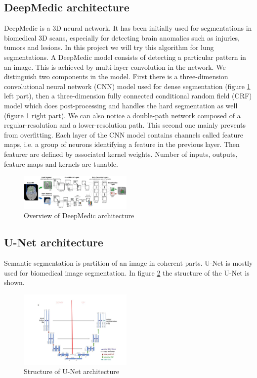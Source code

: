 \subsection{DeepMedic architecture}
DeepMedic is a 3D neural network. It has been initially used for segmentations in biomedical 3D scans, especially for detecting brain anomalies such as injuries, tumors and lesions. In this project we will try this algorithm for lung segmentations. \newline 
A DeepMedic model consists of detecting a particular pattern in an image. This is achieved by multi-layer convolution in the network. We distinguish two components in the model. First there is a three-dimension convolutional neural network (CNN) model used for dense segmentation (figure \ref{deepmedic} left part), then  a three-dimension fully connected conditional random field (CRF) model which does post-processing and handles the hard segmentation as well (figure \ref{deepmedic} right part). We can also notice a double-path network composed of a regular-resolution and a lower-resolution path. This second one mainly prevents from overfitting.
Each layer of the CNN model contains channels called feature maps, i.e. a group of neurons identifying a feature in the previous layer. Then featurer are defined by associated kernel weights. Number of inputs, outputs, feature-maps and kernels are tunable.

\begin{figure}[h!]
	\includegraphics[width=0.49\textwidth, angle=0]{files/deepmedic.png}
	\caption{ Overview of DeepMedic architecture}
	\label{deepmedic}
\end{figure}

\subsection{U-Net architecture}
Semantic segmentation is partition of an image in coherent parts. U-Net is mostly used for biomedical image segmentation. In figure \ref{unetstructure} the structure of the U-Net is shown.\newline

\begin{figure}[h!]
	\includegraphics[width=0.49\textwidth, angle=0]{files/unetstructure.jpg}
	\caption{Structure of U-Net architecture}
	\label{unetstructure}
\end{figure}

